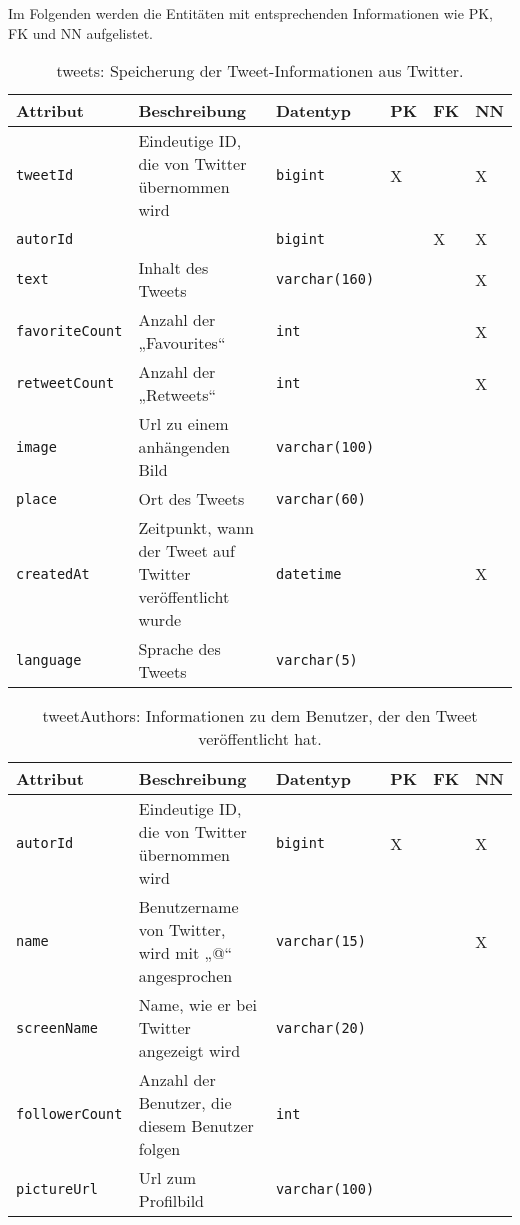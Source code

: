 Im Folgenden werden die Entitäten mit entsprechenden Informationen wie \ac{PK}, \ac{FK} und \ac{NN} aufgelistet.
\begin{table}[!ht]
	\caption{tweets: Speicherung der Tweet-Informationen aus Twitter. }
	\begin{tabular}{p{3cm}p{5cm}p{2cm}p{1cm}p{1cm}p{1cm}}
    \toprule 
    \textbf{Attribut} & \textbf{Beschreibung} & \textbf{Datentyp} & \textbf{PK} & \textbf{FK} & \textbf{NN} \\
    \hline 
    \texttt{tweetId} & Eindeutige ID, die von Twitter übernommen wird & \texttt{bigint} & X & & X   \\
    \texttt{autorId} &  & \texttt{bigint} & & X & X   \\
    \texttt{text} & Inhalt des Tweets  & \texttt{varchar(160)} & & & X   \\
    \texttt{favoriteCount} & Anzahl der „Favourites“  & \texttt{int} & & & X   \\
    \texttt{retweetCount} & Anzahl der „Retweets“ & \texttt{int} & & & X   \\
    \texttt{image} & Url zu einem anhängenden Bild & \texttt{varchar(100)} & & &   \\
    \texttt{place} & Ort des Tweets & \texttt{varchar(60)} & & &   \\
    \texttt{createdAt} & Zeitpunkt, wann der Tweet auf Twitter veröffentlicht wurde & \texttt{datetime} & & & X   \\
    \texttt{language} & Sprache des Tweets & \texttt{varchar(5)} & & &   \\
	\bottomrule
  \end{tabular}
\end{table}

\begin{table}[!ht]
	\caption{tweetAuthors: Informationen zu dem Benutzer, der den Tweet veröffentlicht hat. }
    \begin{tabular}{p{3cm}p{5cm}p{2cm}p{1cm}p{1cm}p{1cm}}
    \toprule 
    \textbf{Attribut} & \textbf{Beschreibung} & \textbf{Datentyp} & \textbf{PK} & \textbf{FK} & \textbf{NN} \\
    \hline 
    \texttt{autorId} & Eindeutige ID, die von Twitter übernommen wird & \texttt{bigint} & X && X   \\
    \texttt{name} & Benutzername von Twitter, wird mit „@“ angesprochen & \texttt{varchar(15)} & & & X   \\
    \texttt{screenName} & Name, wie er bei Twitter angezeigt wird  & \texttt{varchar(20)} & & &   \\
    \texttt{followerCount } & Anzahl der Benutzer, die diesem Benutzer folgen   & \texttt{int} & & &   \\
    \texttt{pictureUrl} & Url zum Profilbild & \texttt{varchar(100)} & & &   \\
   	\bottomrule
  \end{tabular}
\end{table}
      
